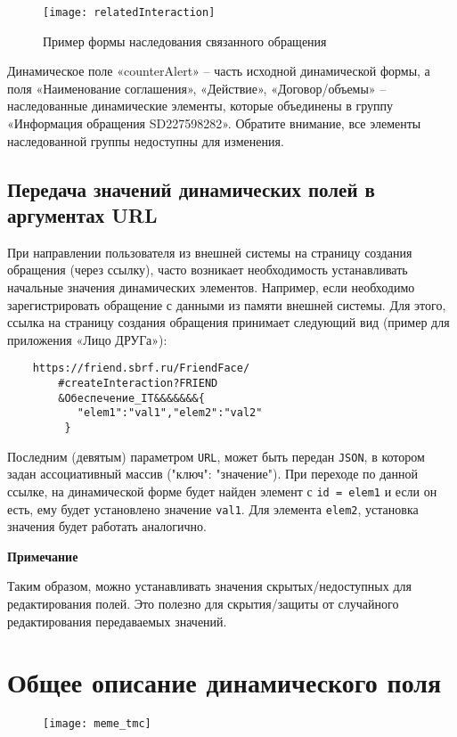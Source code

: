 \documentclass[../index.tex]{subfiles}
\begin{document}
\begin{figure}[h]
    \texttt{[image: relatedInteraction]}
    \centering
    \caption{Пример формы наследования связанного обращения}
\end{figure}

Динамическое поле «counterAlert» – часть исходной динамической формы,
а поля «Наименование соглашения», «Действие», «Договор/объемы» – наследованные динамические элементы,
которые объединены в группу «Информация обращения SD227598282».
Обратите внимание, все элементы наследованной группы недоступны для изменения.

\subsection{Передача значений динамических полей в аргументах URL}
При направлении пользователя из внешней системы на страницу создания обращения (через ссылку),
часто возникает необходимость устанавливать начальные значения динамических элементов.
Например, если необходимо зарегистрировать обращение с данными из памяти внешней системы.
Для этого, ссылка на страницу создания обращения принимает следующий вид (пример для приложения «Лицо ДРУГа»):


\begin{verbatim}
    https://friend.sbrf.ru/FriendFace/
        #createInteraction?FRIEND
        &Обеспечение_IT&&&&&&&{
           "elem1":"val1","elem2":"val2"
         }
\end{verbatim}


Последним (девятым) параметром \verb|URL|, может быть передан \verb|JSON|,
в котором задан ассоциативный массив ("ключ": "значение").
При переходе по данной ссылке, на динамической форме будет найден элемент с \verb|id = elem1|
и если он есть, ему будет установлено значение \verb|val1|.
Для элемента \verb|elem2|, установка значения будет работать аналогично.


\vspace{5mm}
\textbf{Примечание}


Таким образом, можно устанавливать значения скрытых/недоступных для редактирования полей.
Это полезно для скрытия/защиты от случайного редактирования передаваемых значений.


\section{Общее описание динамического поля}

\begin{figure}[h]
	\texttt{[image: meme\_tmc]}
	\centering
\end{figure}
\end{document}
